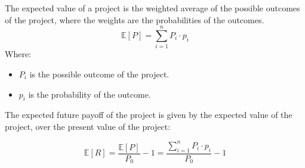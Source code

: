 \begin{definition}
    The expected value of a project is the weighted average of the possible outcomes of the project, where the weights are the probabilities of the outcomes.\\
    \begin{equation}
        \mathbb{E}[P] = \sum_{i=1}^{n} P_i \cdot p_i
    \end{equation}
    Where:
    \begin{itemize}
        \item $P_i$ is the possible outcome of the project.
        \item $p_i$ is the probability of the outcome.
    \end{itemize}
\end{definition}

\begin{definition}

    The expected future payoff of the project is given by the expected value of the project, over the present value of the project:

    \begin{equation}
        \mathbb{E}[R] = \frac{\mathbb{E}[P]}{P_0} -1 = \frac{\sum_{i=1}^{n} P_i \cdot p_i}{P_0} -1
    \end{equation}

\end{definition}
